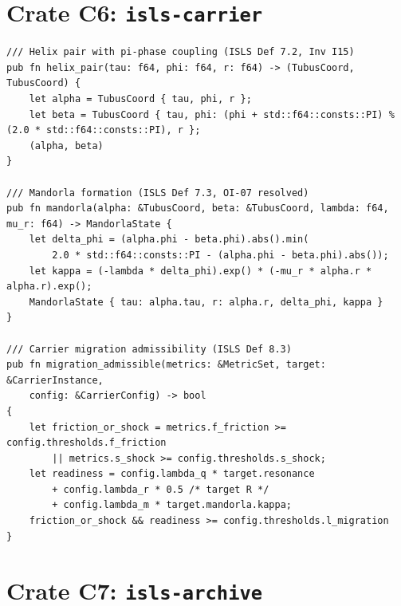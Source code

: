 \documentclass[10pt,a4paper]{article}
\theoremstyle{definition}\newtheorem{definition}{Def}[section]
\theoremstyle{plain}\newtheorem{theorem}{Thm}[section]
\newcommand{\crate}[1]{\texttt{\small\color{rustborder!80!black}#1}}
\begin{document}
\section{Crate C6: \crate{isls-carrier}}
\label{sec:c6}

\begin{lstlisting}[style=rust]
/// Helix pair with pi-phase coupling (ISLS Def 7.2, Inv I15)
pub fn helix_pair(tau: f64, phi: f64, r: f64) -> (TubusCoord, TubusCoord) {
    let alpha = TubusCoord { tau, phi, r };
    let beta = TubusCoord { tau, phi: (phi + std::f64::consts::PI) % (2.0 * std::f64::consts::PI), r };
    (alpha, beta)
}

/// Mandorla formation (ISLS Def 7.3, OI-07 resolved)
pub fn mandorla(alpha: &TubusCoord, beta: &TubusCoord, lambda: f64, mu_r: f64) -> MandorlaState {
    let delta_phi = (alpha.phi - beta.phi).abs().min(
        2.0 * std::f64::consts::PI - (alpha.phi - beta.phi).abs());
    let kappa = (-lambda * delta_phi).exp() * (-mu_r * alpha.r * alpha.r).exp();
    MandorlaState { tau: alpha.tau, r: alpha.r, delta_phi, kappa }
}

/// Carrier migration admissibility (ISLS Def 8.3)
pub fn migration_admissible(metrics: &MetricSet, target: &CarrierInstance,
    config: &CarrierConfig) -> bool
{
    let friction_or_shock = metrics.f_friction >= config.thresholds.f_friction
        || metrics.s_shock >= config.thresholds.s_shock;
    let readiness = config.lambda_q * target.resonance
        + config.lambda_r * 0.5 /* target R */
        + config.lambda_m * target.mandorla.kappa;
    friction_or_shock && readiness >= config.thresholds.l_migration
}
\end{lstlisting}

\section{Crate C7: \crate{isls-archive}}
\label{sec:c7}
\end{document}
